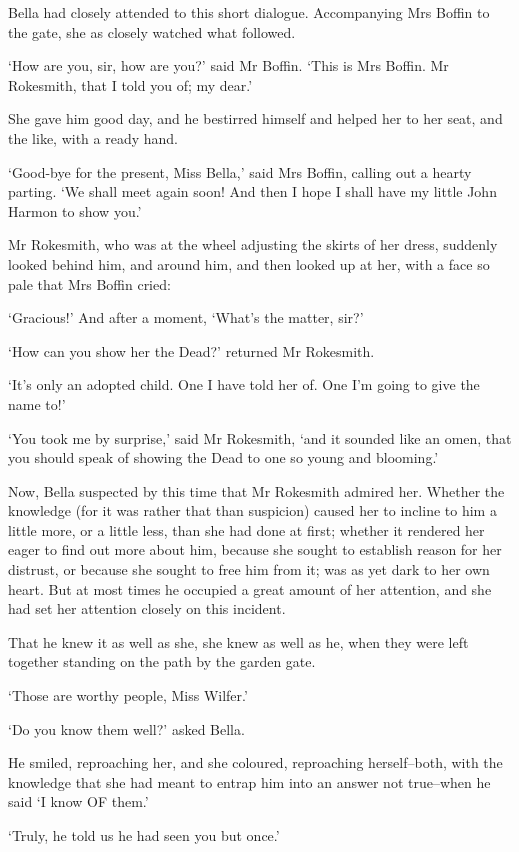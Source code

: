 Bella had closely attended to this short dialogue. Accompanying Mrs
Boffin to the gate, she as closely watched what followed.

‘How are you, sir, how are you?’ said Mr Boffin. ‘This is Mrs Boffin. Mr
Rokesmith, that I told you of; my dear.’

She gave him good day, and he bestirred himself and helped her to her
seat, and the like, with a ready hand.

‘Good-bye for the present, Miss Bella,’ said Mrs Boffin, calling out a
hearty parting. ‘We shall meet again soon! And then I hope I shall have
my little John Harmon to show you.’

Mr Rokesmith, who was at the wheel adjusting the skirts of her dress,
suddenly looked behind him, and around him, and then looked up at her,
with a face so pale that Mrs Boffin cried:

‘Gracious!’ And after a moment, ‘What’s the matter, sir?’

‘How can you show her the Dead?’ returned Mr Rokesmith.

‘It’s only an adopted child. One I have told her of. One I’m going to
give the name to!’

‘You took me by surprise,’ said Mr Rokesmith, ‘and it sounded like an
omen, that you should speak of showing the Dead to one so young and
blooming.’

Now, Bella suspected by this time that Mr Rokesmith admired her. Whether
the knowledge (for it was rather that than suspicion) caused her to
incline to him a little more, or a little less, than she had done at
first; whether it rendered her eager to find out more about him, because
she sought to establish reason for her distrust, or because she sought
to free him from it; was as yet dark to her own heart. But at most
times he occupied a great amount of her attention, and she had set her
attention closely on this incident.

That he knew it as well as she, she knew as well as he, when they were
left together standing on the path by the garden gate.

‘Those are worthy people, Miss Wilfer.’

‘Do you know them well?’ asked Bella.

He smiled, reproaching her, and she coloured, reproaching herself--both,
with the knowledge that she had meant to entrap him into an answer not
true--when he said ‘I know OF them.’

‘Truly, he told us he had seen you but once.’

